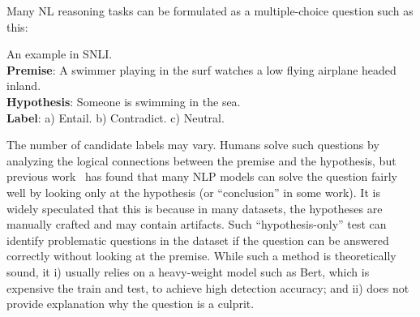 Many NL reasoning tasks can be formulated as a multiple-choice question
such as this:
\begin{example}\label{exp:snli}
An example in SNLI.\\

\noindent
\textbf{Premise}: A swimmer playing in the surf watches a low flying airplane headed inland. \\

\noindent
\textbf{Hypothesis}: Someone is swimming in the sea.\\

\noindent
\textbf{Label}: a) Entail. b) Contradict.  c) Neutral.
\end{example}
The number of candidate labels may vary. Humans solve such questions by
analyzing the logical connections between the premise and the hypothesis,
but previous work~\cite{naik2018stress,schuster2019towards} 
has found that many NLP models can solve the question
fairly well by looking only at the hypothesis (or ``conclusion'' in some work).
It is widely speculated that this is because in many datasets, 
the hypotheses are manually crafted
and may contain artifacts.
Such ``hypothesis-only'' test can identify problematic questions in the dataset
if the question can be answered correctly without looking at the premise. While
such a method is theoretically sound, 
it i) usually relies on a heavy-weight model such as Bert, which is
expensive the train and test, to achieve high detection accuracy; 
and ii) does not provide explanation why the question is a culprit.  

